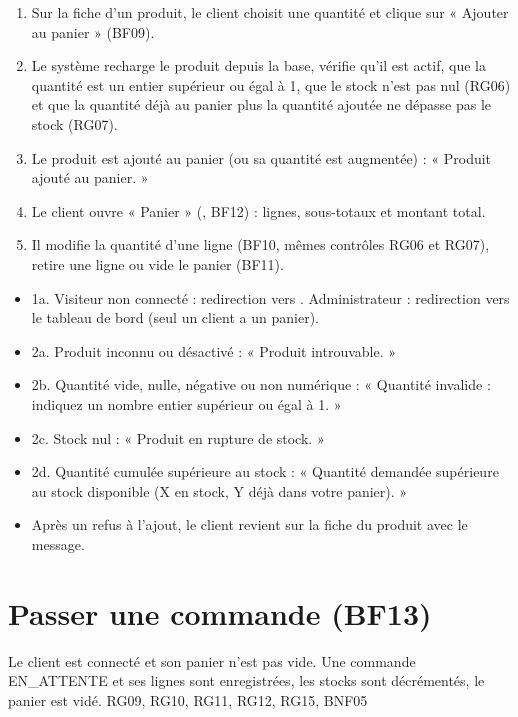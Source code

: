 \begin{enumerate}
  \item Sur la fiche d'un produit, le client choisit une quantité et clique sur « Ajouter au panier » (BF09).
  \item Le système recharge le produit depuis la base, vérifie qu'il est actif, que la quantité est un entier
        supérieur ou égal à 1, que le stock n'est pas nul (RG06) et que la quantité déjà au panier plus la
        quantité ajoutée ne dépasse pas le stock (RG07).
  \item Le produit est ajouté au panier (ou sa quantité est augmentée) : « Produit ajouté au panier. »
  \item Le client ouvre « Panier » (, BF12) : lignes, sous-totaux et montant total.
  \item Il modifie la quantité d'une ligne (BF10, mêmes contrôles RG06 et RG07), retire une ligne ou vide le
        panier (BF11).
\end{enumerate}

\begin{itemize}
  \item 1a. Visiteur non connecté : redirection vers . Administrateur : redirection vers le tableau de
        bord (seul un client a un panier).
  \item 2a. Produit inconnu ou désactivé : « Produit introuvable. »
  \item 2b. Quantité vide, nulle, négative ou non numérique : « Quantité invalide : indiquez un nombre entier
        supérieur ou égal à 1. »
  \item 2c. Stock nul : « Produit en rupture de stock. »
  \item 2d. Quantité cumulée supérieure au stock : « Quantité demandée supérieure au stock disponible (X en stock,
        Y déjà dans votre panier). »
  \item Après un refus à l'ajout, le client revient sur la fiche du produit avec le message.
\end{itemize}

\section{Passer une commande (BF13)}

  {Le client est connecté et son panier n'est pas vide.}
  {Une commande EN\_ATTENTE et ses lignes sont enregistrées, les stocks sont décrémentés, le panier est vidé.}
  {RG09, RG10, RG11, RG12, RG15, BNF05}

